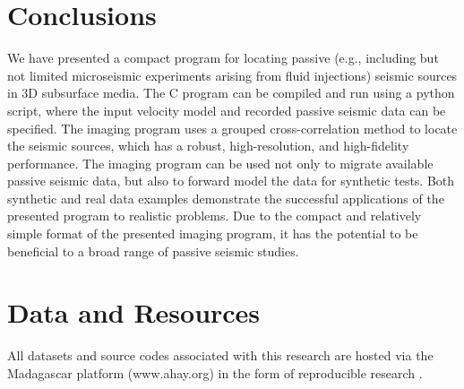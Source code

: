 
\section{Conclusions}
We have presented a compact program for locating passive (e.g., including but not limited  microseismic experiments arising from fluid injections) seismic sources in 3D subsurface media. The C program can be compiled and run using a python script, where the input velocity model and recorded passive seismic data can be specified. The imaging program uses a grouped cross-correlation method to locate the seismic sources, which has a robust, high-resolution, and high-fidelity performance. The imaging program can be used not only to migrate available passive seismic data, but also to forward model the data for synthetic tests. Both synthetic and real data examples demonstrate the successful applications of the presented program to realistic problems. Due to the compact and relatively simple format of the presented imaging program, it has the potential to be beneficial to a broad range of passive seismic studies. 

\section{Data and Resources}
All datasets and source codes associated with this research are hosted via the Madagascar platform (www.ahay.org) in the form of reproducible research \cite[]{mada2013}.

